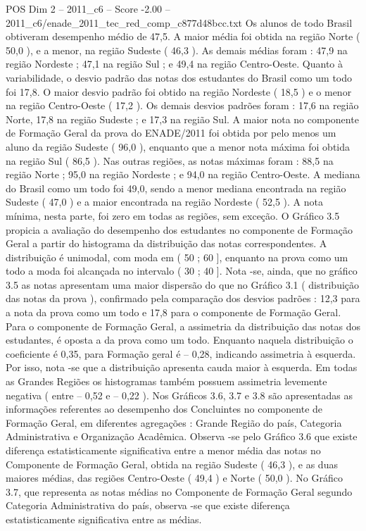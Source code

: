 \begin{textsample}{POS Dim 2 – 2011\_c6 – Score -2.00 – 2011\_c6/enade\_2011\_tec\_red\_comp\_c877d48bcc.txt}
Os alunos de todo Brasil obtiveram desempenho médio de 47,5.
A maior média foi obtida na região Norte ( 50,0 ), e a menor, na região Sudeste ( 46,3 ).
As demais médias foram : 47,9 na região Nordeste ; 47,1 na região Sul ; e 49,4 na região Centro-Oeste.
Quanto à variabilidade, o desvio padrão das notas dos estudantes do Brasil como um todo foi 17,8.
O maior desvio padrão foi obtido na região Nordeste ( 18,5 ) e o menor na região Centro-Oeste ( 17,2 ).
Os demais desvios padrões foram : 17,6 na região Norte, 17,8 na região Sudeste ; e 17,3 na região Sul.
A maior nota no componente de Formação Geral da prova do ENADE/2011 foi obtida por pelo menos um aluno da região Sudeste ( 96,0 ), enquanto que a menor nota máxima foi obtida na região Sul ( 86,5 ).
Nas outras regiões, as notas máximas foram : 88,5 na região Norte ; 95,0 na região Nordeste ; e 94,0 na região Centro-Oeste.
A mediana do Brasil como um todo foi 49,0, sendo a menor mediana encontrada na região Sudeste ( 47,0 ) e a maior encontrada na região Nordeste ( 52,5 ).
A nota mínima, nesta parte, foi zero em todas as regiões, sem exceção.
O Gráfico 3.5 propicia a avaliação do desempenho dos estudantes no componente de Formação Geral a partir do histograma da distribuição das notas correspondentes.
A distribuição é unimodal, com moda em ( 50 ; 60 ], enquanto na prova como um todo a moda foi alcançada no intervalo ( 30 ; 40 ].
Nota -se, ainda, que no gráfico 3.5 as notas apresentam uma maior dispersão do que no Gráfico 3.1 ( distribuição das notas da prova ), confirmado pela comparação dos desvios padrões : 12,3 para a nota da prova como um todo e 17,8 para o componente de Formação Geral.
Para o componente de Formação Geral, a assimetria da distribuição das notas dos estudantes, é oposta a da prova como um todo.
Enquanto naquela distribuição o coeficiente é 0,35, para Formação geral é – 0,28, indicando assimetria à esquerda.
Por isso, nota -se que a distribuição apresenta cauda maior à esquerda.
Em todas as Grandes Regiões os histogramas também possuem assimetria levemente negativa ( entre – 0,52 e – 0,22 ).
Nos Gráficos 3.6, 3.7 e 3.8 são apresentadas as informações referentes ao desempenho dos Concluintes no componente de Formação Geral, em diferentes agregações : Grande Região do país, Categoria Administrativa e Organização Acadêmica.
Observa -se pelo Gráfico 3.6 que existe diferença estatisticamente significativa entre a menor média das notas no Componente de Formação Geral, obtida na região Sudeste ( 46,3 ), e as duas maiores médias, das regiões Centro-Oeste ( 49,4 ) e Norte ( 50,0 ).
No Gráfico 3.7, que representa as notas médias no Componente de Formação Geral segundo Categoria Administrativa do país, observa -se que existe diferença estatisticamente significativa entre as médias.

\end{textsample}
